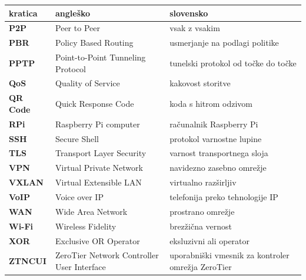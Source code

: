 \documentclass[a4paper, 12pt]{book}
\newcommand{\clearemptydoublepage}{\newpage{\pagestyle{empty}\cleardoublepage}}
\begin{document}
\noindent\begin{tabular}{p{}|p{}|p{}}
  {\bf kratica} & {\bf angleško}                             & {\bf slovensko} \\ \hline\hline
  {\bf P2P}   & Peer to Peer    &  vsak z vsakim \\ \hline
  {\bf PBR}   & Policy Based Routing    &  usmerjanje na podlagi politike \\ \hline
  {\bf PPTP}   & Point-to-Point Tunneling Protocol    &  tunelski protokol od točke do točke \\ \hline
  {\bf QoS}   & Quality of Service   &  kakovost storitve\\\hline
  {\bf QR Code}   & Quick Response Code   &  koda s hitrom odzivom\\\hline
  {\bf RPi}   & Raspberry Pi computer            & računalnik Raspberry Pi \\\hline
  {\bf SSH}   & Secure Shell    &  protokol varnostne lupine \\\hline
  {\bf TLS}      & Transport Layer Security             & varnost transportnega sloja \\\hline
  {\bf VPN}      & Virtual Private Network             & navidezno zasebno omrežje \\\hline
  {\bf VXLAN}   & Virtual Extensible LAN    &  virtualno razširljiv \\\hline
  
  {\bf VoIP}   & Voice over IP    &  telefonija preko tehnologije IP \\\hline
  
  
  {\bf WAN}   & Wide Area Network              & prostrano omrežje \\\hline
 
  
  {\bf Wi-Fi}   & Wireless Fidelity             & brezžična vernost \\\hline

  
  {\bf XOR}   & Exclusive OR Operator   &   eksluzivni ali operator\\\hline
  {\bf ZTNCUI}   & ZeroTier Network Controller User Interface   &   uporabniški vmesnik za kontroler omrežja ZeroTier\\
  
\end{tabular}


\clearemptydoublepage

\end{document}

